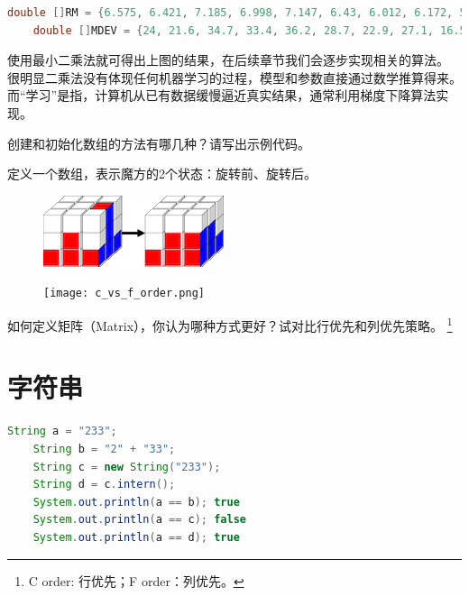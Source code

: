 \begin{example}
	\begin{lstlisting}[language=java]
	double []RM = {6.575, 6.421, 7.185, 6.998, 7.147, 6.43, 6.012, 6.172, 5.631};
	double []MDEV = {24, 21.6, 34.7, 33.4, 36.2, 28.7, 22.9, 27.1, 16.5};
	\end{lstlisting}

	使用最小二乘法就可得出上图的结果，在后续章节我们会逐步实现相关的算法。
	很明显二乘法没有体现任何机器学习的过程，模型和参数直接通过数学推算得来。
	而“学习”是指，计算机从已有数据缓慢逼近真实结果，通常利用梯度下降算法实现。
\end{example}
\bigskip

\begin{exercise}
	创建和初始化数组的方法有哪几种？请写出示例代码。
\end{exercise}

\begin{exercise}
	定义一个数组，表示魔方的2个状态：旋转前、旋转后。
\end{exercise}

\begin{figure}[!htb] \centering
	\begin{minipage}{0.4\textwidth}
		\centerline{\includegraphics[scale=.5]{part1/rubik.png}}
	\end{minipage}
	\begin{minipage}{0.4\textwidth}
		\centerline{\texttt{[image: c\_vs\_f\_order.png]}}
	\end{minipage}
\end{figure}

\begin{exercise}
	如何定义矩阵（Matrix），你认为哪种方式更好？试对比行优先和列优先策略。
	\footnote{C order: 行优先；F order：列优先。}
\end{exercise}

\section{字符串}

\begin{lstlisting}[language=Java]
	String a = "233";
	String b = "2" + "33";
	String c = new String("233");
	String d = c.intern();
	System.out.println(a == b); true
	System.out.println(a == c); false
	System.out.println(a == d); true
\end{lstlisting}

